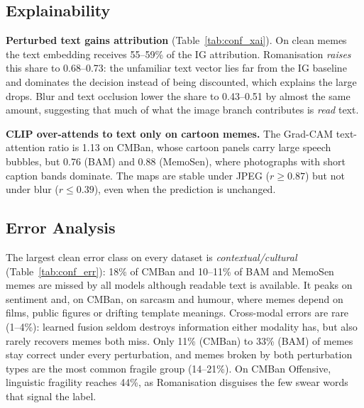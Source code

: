 

\subsection{Explainability}
\label{sec:results:xai}

\textbf{Perturbed text gains attribution} (Table~\ref{tab:conf_xai}). On clean memes the text embedding receives
55--59\% of the IG attribution. Romanisation \emph{raises} this share to 0.68--0.73: the unfamiliar text vector lies
far from the IG baseline and dominates the decision instead of being discounted, which explains the large drops.
Blur and text occlusion lower the share to 0.43--0.51 by almost the same amount, suggesting that much of what the
image branch contributes is \emph{read} text.

\textbf{CLIP over-attends to text only on cartoon memes.} The Grad-CAM text-attention ratio is 1.13 on CMBan, whose
cartoon panels carry large speech bubbles, but 0.76 (BAM) and 0.88 (MemoSen), where photographs with short caption
bands dominate. The maps are stable under JPEG ($r\geq0.87$) but not under blur ($r\leq0.39$), even when the
prediction is unchanged.



\subsection{Error Analysis}
\label{sec:results:errors}

The largest clean error class on every dataset is \emph{contextual/cultural} (Table~\ref{tab:conf_err}): 18\% of
CMBan and 10--11\% of BAM and MemoSen memes are missed by all models although readable text is available. It peaks on
sentiment and, on CMBan, on sarcasm and humour, where memes depend on films, public figures or drifting template
meanings. Cross-modal errors are rare (1--4\%): learned fusion seldom destroys information either modality has, but
also rarely recovers memes both miss. Only 11\% (CMBan) to 33\% (BAM) of memes stay correct under every
perturbation, and memes broken by both perturbation types are the most common fragile group (14--21\%). On CMBan
Offensive, linguistic fragility reaches 44\%, as Romanisation disguises the few swear words that signal the label.
